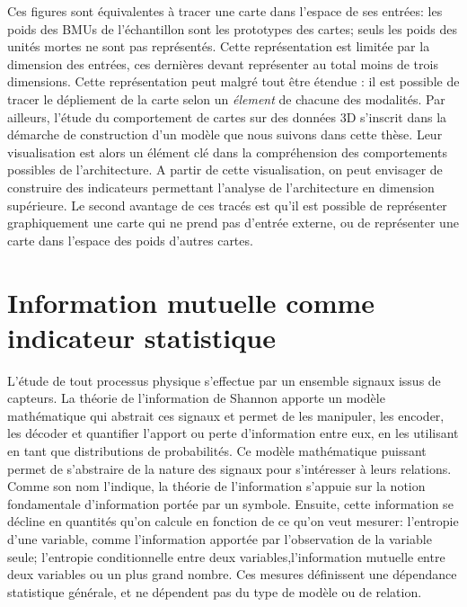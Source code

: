 Ces figures sont équivalentes à tracer une carte dans l'espace de ses entrées: les poids des BMUs de l'échantillon sont les prototypes des cartes; seuls les poids des unités mortes ne sont pas représentés.
Cette représentation est limitée par la dimension des entrées, ces dernières devant représenter au total moins de trois dimensions. Cette représentation peut malgré tout être étendue : il est possible de tracer le dépliement de la carte selon un \emph{élement} de chacune des modalités.
Par ailleurs, l'étude du comportement de cartes sur des données 3D s'inscrit dans la démarche de construction d'un modèle que nous suivons dans cette thèse. Leur visualisation est alors un élément clé dans la compréhension des comportements possibles de l'architecture. A partir de cette visualisation, on peut envisager de construire des indicateurs permettant l'analyse de l'architecture en dimension supérieure. 
Le second avantage de ces tracés est qu'il est possible de représenter graphiquement une carte qui ne prend pas d'entrée externe, ou de représenter une carte dans l'espace des poids d'autres cartes.

\section{Information mutuelle comme indicateur statistique}

L'étude de tout processus physique s'effectue par un ensemble signaux issus de capteurs. La théorie de l'information de Shannon \cite{Shannon1948AMT} apporte un modèle mathématique qui abstrait ces signaux et permet de les manipuler, les encoder, les décoder et quantifier l'apport ou perte d'information entre eux, en les utilisant en tant que distributions de probabilités.
Ce modèle mathématique puissant permet de s'abstraire de la nature des signaux pour s'intéresser à leurs relations. Comme son nom l'indique, la théorie de l'information s'appuie sur la notion fondamentale d'information portée par un symbole. Ensuite, cette information se décline en quantités qu'on calcule en fonction de ce qu'on veut mesurer: l'entropie d'une variable, comme l'information apportée par l'observation de la variable seule; l'entropie conditionnelle entre deux variables,l'information mutuelle entre deux variables ou un plus grand nombre. Ces mesures définissent une dépendance statistique générale, et ne dépendent pas du type de modèle ou de relation.

